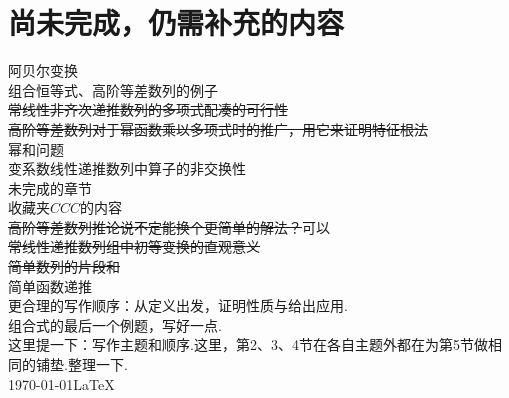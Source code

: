 \documentclass[10pt]{article}
\numberwithin{equation}{section}
\begin{document}
\section{尚未完成，仍需补充的内容}
\noindent 阿贝尔变换\\
组合恒等式、高阶等差数列的例子\\
\sout{常线性非齐次递推数列的多项式配凑的可行性}\\
\sout{高阶等差数列对于幂函数乘以多项式时的推广，用它来证明特征根法}\\
幂和问题\\
变系数线性递推数列中算子的非交换性\\
未完成的章节\\
收藏夹$CCC$的内容\\
\sout{高阶等差数列推论说不定能换个更简单的解法？}可以\\
\sout{常线性递推数列组中初等变换的直观意义}\\
\sout{简单数列的片段和}\\
简单函数递推\\
更合理的写作顺序：从定义出发，证明性质与给出应用.\\
组合式的最后一个例题，写好一点.\\
这里提一下：写作主题和顺序.这里，第2、3、4节在各自主题外都在为第5节做相同的铺垫.整理一下.\\
\today\LaTeX
\end{document}
